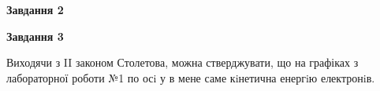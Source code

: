 \documentclass[a4paper,14pt]{extreport}
\begin{document}
	
	
	

\textbf{Завдання 2}
	

	\begin{center}
	\begin{figure}[h!]
		\label{ris2}
	\end{figure}
	\end{center}
	
	

\textbf{Завдання 3}


	Виходячи з II законом Столетова, можна стверджувати, що на графіках з лабораторної роботи №1  по осi у в мене саме кiнетична енергiю електронiв.
\end{document}
